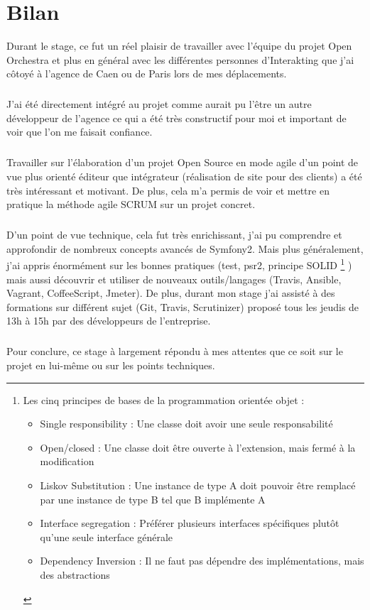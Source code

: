 \chapter*{Bilan}
Durant le stage, ce fut un réel plaisir de travailler avec l'équipe du projet Open Orchestra et plus en général avec les différentes personnes d'Interakting que j'ai côtoyé à l'agence de Caen ou de Paris lors de mes déplacements.
\paragraph{}
J'ai été directement intégré au projet comme aurait pu l'être un autre développeur de l'agence ce qui a été très constructif pour moi et important de voir que l'on me faisait confiance.
\paragraph{}
Travailler sur l'élaboration d'un projet Open Source en mode agile d'un point de vue plus orienté éditeur que intégrateur (réalisation de site pour des clients) a été très intéressant et motivant.  De plus, cela m'a permis de voir et mettre en pratique la méthode agile SCRUM sur un projet concret.
\paragraph{}
D'un point de vue technique, cela fut très enrichissant, j'ai pu comprendre et approfondir de nombreux concepts avancés de Symfony2. Mais plus généralement, j'ai appris énormément sur les bonnes pratiques (test, psr2, principe SOLID \footnote{Les cinq principes de bases de la programmation orientée objet :
\begin{itemize}
\item Single responsibility : Une classe doit avoir une seule responsabilité
\item Open/closed : Une classe doit être ouverte à l'extension, mais fermé à la modification
\item Liskov Substitution : Une instance de type A doit pouvoir être remplacé par une instance de type B tel que B implémente A
\item Interface segregation : Préférer plusieurs interfaces spécifiques plutôt qu'une seule interface générale
\item Dependency Inversion : Il ne faut pas dépendre des implémentations, mais des abstractions
\end{itemize}
}
) mais aussi découvrir et utiliser de nouveaux outils/langages (Travis, Ansible, Vagrant, CoffeeScript, Jmeter). 
De plus, durant mon stage j'ai assisté à des formations sur différent sujet (Git, Travis, Scrutinizer) proposé tous les jeudis de 13h à 15h par des développeurs de l'entreprise.
\paragraph{}
Pour conclure, ce stage à largement répondu à mes attentes que ce soit sur le projet en lui-même ou sur les points techniques.